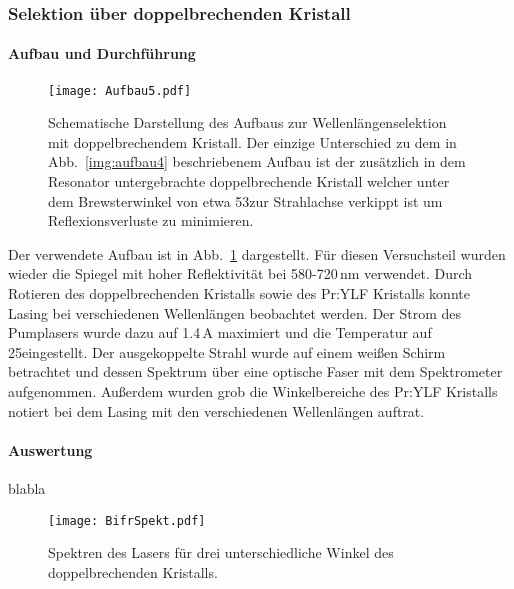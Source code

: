 \subsubsection{Selektion über doppelbrechenden Kristall}


\paragraph{Aufbau und Durchführung}


\begin{figure}[H]
\begin{center}
  \texttt{[image: Aufbau5.pdf]}
  \caption{Schematische Darstellung des Aufbaus zur Wellenlängenselektion mit doppelbrechendem Kristall.
   Der einzige Unterschied zu dem in Abb.~\ref{img:aufbau4} beschriebenem Aufbau ist der zusätzlich
  in dem Resonator untergebrachte doppelbrechende Kristall welcher unter dem Brewsterwinkel von
  etwa 53\grad zur Strahlachse verkippt ist um Reflexionsverluste zu minimieren.}
  \label{img:aufbau5}
\end{center}
\end{figure}

Der verwendete Aufbau ist in Abb.~\ref{img:aufbau5} dargestellt.
Für diesen Versuchsteil wurden wieder die Spiegel mit hoher Reflektivität bei 580-720\,nm verwendet.
Durch Rotieren des doppelbrechenden Kristalls sowie des Pr:YLF Kristalls konnte Lasing bei
verschiedenen Wellenlängen beobachtet werden. Der Strom des Pumplasers wurde dazu auf 1.4\,A
maximiert und die Temperatur auf 25\grad eingestellt. Der ausgekoppelte Strahl wurde auf einem
weißen Schirm betrachtet und dessen Spektrum über eine optische Faser mit dem Spektrometer
aufgenommen. Außerdem wurden grob die Winkelbereiche des Pr:YLF Kristalls notiert bei dem Lasing
mit den verschiedenen Wellenlängen auftrat.




\paragraph{Auswertung}
blabla

\begin{figure}[H]
\begin{center}
  \texttt{[image: BifrSpekt.pdf]}
  \caption{Spektren des Lasers für drei unterschiedliche Winkel des doppelbrechenden Kristalls.}
  \label{img:BifrSpekt}
\end{center}
\end{figure}

